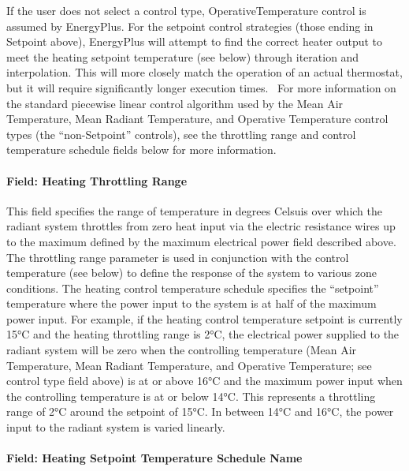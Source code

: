 If the user does not select a control type, OperativeTemperature control is assumed by EnergyPlus. For the setpoint control strategies (those ending in Setpoint above), EnergyPlus will attempt to find the correct heater output to meet the heating setpoint temperature (see below) through iteration and interpolation. This will more closely match the operation of an actual thermostat, but it will require significantly longer execution times.~ For more information on the standard piecewise linear control algorithm used by the Mean Air Temperature, Mean Radiant Temperature, and Operative Temperature control types (the ``non-Setpoint'' controls), see the throttling range and control temperature schedule fields below for more information.

\paragraph{Field: Heating Throttling Range}\label{field-heating-throttling-range-1}

This field specifies the range of temperature in degrees Celsuis over which the radiant system throttles from zero heat input via the electric resistance wires up to the maximum defined by the maximum electrical power field described above. The throttling range parameter is used in conjunction with the control temperature (see below) to define the response of the system to various zone conditions. The heating control temperature schedule specifies the ``setpoint'' temperature where the power input to the system is at half of the maximum power input. For example, if the heating control temperature setpoint is currently 15°C and the heating throttling range is 2°C, the electrical power supplied to the radiant system will be zero when the controlling temperature (Mean Air Temperature, Mean Radiant Temperature, and Operative Temperature; see control type field above) is at or above 16°C and the maximum power input when the controlling temperature is at or below 14°C. This represents a throttling range of 2°C around the setpoint of 15°C. In between 14°C and 16°C, the power input to the radiant system is varied linearly.

\paragraph{Field: Heating Setpoint Temperature Schedule Name}\label{field-heating-setpoint-temperature-schedule-name-1}

